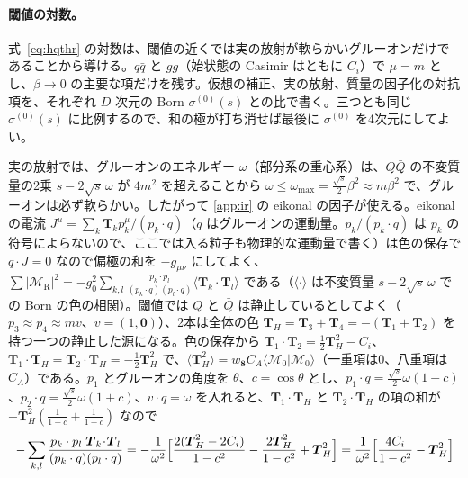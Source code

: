 \documentclass[a4paper,10pt]{ltjsarticle}
\begin{document}
\paragraph{閾値の対数。}式~\eqref{eq:hqthr} の対数は、閾値の近くでは実の放射が軟らかいグルーオンだけであることから導ける。$q\bar q$ と $gg$（始状態の Casimir はともに $C_i$）で $\mu=m$ とし、$\beta\to0$ の主要な項だけを残す。仮想の補正、実の放射、質量の因子化の対抗項を、それぞれ $D$ 次元の Born $\sigma^{(0)}(s)$ との比で書く。三つとも同じ $\sigma^{(0)}(s)$ に比例するので、和の極が打ち消せば最後に $\sigma^{(0)}$ を4次元にしてよい。

実の放射では、グルーオンのエネルギー $\omega$（部分系の重心系）は、$Q\bar Q$ の不変質量の2乗 $s-2\sqrt s\,\omega$ が $4m^2$ を超えることから $\omega\le\omega_{\max}=\frac{\sqrt s}2\beta^2\approx m\beta^2$ で、グルーオンは必ず軟らかい。したがって \ref{app:ir} の eikonal の因子が使える。eikonal の電流 $J^\mu=\sum_k\boldsymbol T_kp_k^\mu/(p_k\cdot q)$（$q$ はグルーオンの運動量。$p_k/(p_k\cdot q)$ は $p_k$ の符号によらないので、ここでは入る粒子も物理的な運動量で書く）は色の保存で $q\cdot J=0$ なので偏極の和を $-g_{\mu\nu}$ にしてよく、$\sum|\mathcal M_{\mathrm R}|^2=-g_0^2\sum_{k,l}\frac{p_k\cdot p_l}{(p_k\cdot q)(p_l\cdot q)}\langle\boldsymbol T_k\cdot\boldsymbol T_l\rangle$ である（$\langle\cdot\rangle$ は不変質量 $s-2\sqrt s\,\omega$ での Born の色の相関）。閾値では $Q$ と $\bar Q$ は静止しているとしてよく（$p_3\approx p_4\approx mv$、$v=(1,\boldsymbol 0)$）、2本は全体の色 $\boldsymbol T_H=\boldsymbol T_3+\boldsymbol T_4=-(\boldsymbol T_1+\boldsymbol T_2)$ を持つ一つの静止した源になる。色の保存から $\boldsymbol T_1\cdot\boldsymbol T_2=\frac12\boldsymbol T_H^2-C_i$、$\boldsymbol T_1\cdot\boldsymbol T_H=\boldsymbol T_2\cdot\boldsymbol T_H=-\frac12\boldsymbol T_H^2$ で、$\langle\boldsymbol T_H^2\rangle=w_{\mathbf 8}C_A\langle\mathcal M_0|\mathcal M_0\rangle$（一重項は0、八重項は $C_A$）である。$p_1$ とグルーオンの角度を $\theta$、$c=\cos\theta$ とし、$p_1\cdot q=\frac{\sqrt s}2\omega(1-c)$、$p_2\cdot q=\frac{\sqrt s}2\omega(1+c)$、$v\cdot q=\omega$ を入れると、$\boldsymbol T_1\cdot\boldsymbol T_H$ と $\boldsymbol T_2\cdot\boldsymbol T_H$ の項の和が $-\boldsymbol T_H^2(\frac1{1-c}+\frac1{1+c})$ なので
\begin{equation*}
-\sum_{k,l}\frac{p_k\cdot p_l\;\boldsymbol T_k\!\cdot\!\boldsymbol T_l}{(p_k\cdot q)(p_l\cdot q)}
=-\frac1{\omega^2}\Bigl[\frac{2(\boldsymbol T_H^2-2C_i)}{1-c^2}-\frac{2\boldsymbol T_H^2}{1-c^2}+\boldsymbol T_H^2\Bigr]
=\frac1{\omega^2}\Bigl[\frac{4C_i}{1-c^2}-\boldsymbol T_H^2\Bigr]
\end{equation*}
\end{document}

